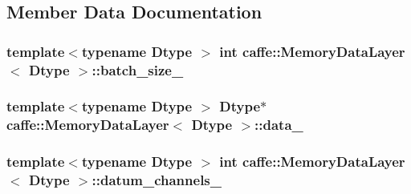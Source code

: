 \subsection{Member Data Documentation}
\hypertarget{classcaffe_1_1_memory_data_layer_a94335b05660c950a4ba711342daff276}{
\subsubsection[{batch\+\_\+size\+\_\+}]{\setlength{\rightskip}{0pt plus 5cm}template$<$typename Dtype $>$ int {\bf caffe\+::\+Memory\+Data\+Layer}$<$ Dtype $>$\+::batch\+\_\+size\+\_\+\hspace{0.3cm}{\ttfamily [protected]}}}\label{classcaffe_1_1_memory_data_layer_a94335b05660c950a4ba711342daff276}
\hypertarget{classcaffe_1_1_memory_data_layer_a57a7e3dca84db2b07cb009a44c6ae45c}{
\subsubsection[{data\+\_\+}]{\setlength{\rightskip}{0pt plus 5cm}template$<$typename Dtype $>$ Dtype$\ast$ {\bf caffe\+::\+Memory\+Data\+Layer}$<$ Dtype $>$\+::data\+\_\+\hspace{0.3cm}{\ttfamily [protected]}}}\label{classcaffe_1_1_memory_data_layer_a57a7e3dca84db2b07cb009a44c6ae45c}
\hypertarget{classcaffe_1_1_memory_data_layer_ae77bcb4c0f6183477f264438c90fe6b6}{
\subsubsection[{datum\+\_\+channels\+\_\+}]{\setlength{\rightskip}{0pt plus 5cm}template$<$typename Dtype $>$ int {\bf caffe\+::\+Memory\+Data\+Layer}$<$ Dtype $>$\+::datum\+\_\+channels\+\_\+\hspace{0.3cm}{\ttfamily [protected]}}}\label{classcaffe_1_1_memory_data_layer_ae77bcb4c0f6183477f264438c90fe6b6}
